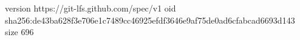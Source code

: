 version https://git-lfs.github.com/spec/v1
oid sha256:de43ba628f3e706e1c7489cc46925efdf3646e9af75de0ad6cfabcad6693d143
size 696
